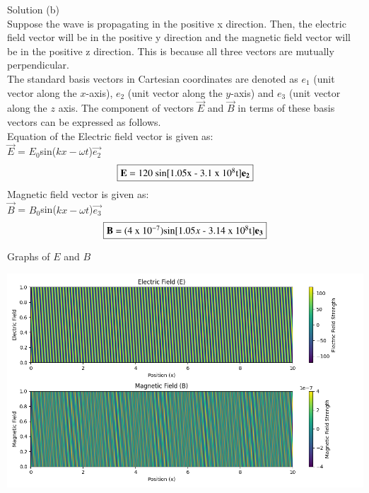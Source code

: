 \documentclass[journal,12pt,twocolumn]{IEEEtran}
\theoremstyle{remark}
\begin{document}
\begin{flushleft}
    Solution (b)\\
    Suppose the wave is propagating in the positive x direction. Then, the electric field vector will be in the positive y direction and the magnetic field vector will be in the positive z direction. This is because all three vectors are mutually perpendicular.\\
    \bigskip
    The standard basis vectors in Cartesian coordinates are denoted as $e_1$ (unit vector along the $x$-axis), $e_2$ (unit vector along the $y$-axis) and $e_3$ (unit vector along the $z$ axis. The component of vectors $\vec{E}$ and $\vec{B}$ in terms of these basis vectors can be expressed as follows.\\
    \bigskip
    Equation of the Electric field vector is given as:\\
    $\vec{E}$ = $E_0$sin($kx - \omega t$)$\vec{e_2}$\\
    \begin{align}
    \fbox{$\vec{E}$ = 120 sin[1.05x - 3.1 x 10$^8$t]$\vec{e_2}$} \label{12.8.8.5}
    \end{align}
    \bigskip
    Magnetic field vector is given as:\\
    $\vec{B}$ = $B_0$sin($kx - \omega t$)$\vec{e_3}$\\
    \begin{align}
    \fbox{$\vec{B}$ = (4 x 10$^{-7}$)sin[1.05$x$ - 3.14 x 10$^8$t]$\vec{e_3}$}
    \end{align}  
\end{flushleft}

\renewcommand{\thefigure}{\theenumi}
\renewcommand{\thetable}{\theenumi}

\newpage
\begin{center}
    \begin{table}[h]
	
   \end{table}

    \bigskip
    \begin{flushleft}
    Graphs of ${E}$ and ${B}$\\
    \end{flushleft}
    
    
    \includegraphics[width=1.0\textwidth]{figs/Figure1_12.8_8.png}
\end{center}
\end{document}
